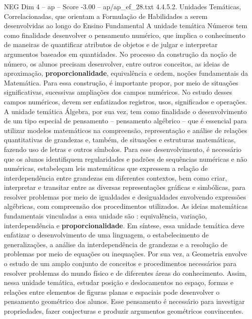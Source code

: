 \begin{textsample}{NEG Dim 4 – ap – Score -3.00 – ap/ap\_ef\_28.txt}  \label{ex:f4_neg_053}
4.4.5.2.
Unidades Temáticas, Correlacionadas, que orientam a Formulação de Habilidades a serem desenvolvidas ao longo do Ensino Fundamental A unidade temática Números tem como finalidade desenvolver o pensamento numérico, que implica o conhecimento de maneiras de quantificar atributos de objetos e de julgar e interpretar argumentos baseados em quantidades.
No processo da construção da noção de número, os alunos precisam desenvolver, entre outros conceitos, as ideias de aproximação, \textbf{proporcionalidade}, equivalência e ordem, noções fundamentais da Matemática.
Para essa construção, é importante propor, por meio de situações significativas, sucessivas ampliações dos campos numéricos.
No estudo desses campos numéricos, devem ser enfatizados registros, usos, significados e operações.
A unidade temática Álgebra, por sua vez, tem como finalidade o desenvolvimento de um tipo especial de pensamento – pensamento algébrico – que é essencial para utilizar modelos matemáticos na compreensão, representação e análise de relações quantitativas de grandezas e, também, de situações e estruturas matemáticas, fazendo uso de letras e outros símbolos.
Para esse desenvolvimento, é necessário que os alunos identifiquem regularidades e padrões de sequências numéricas e não numéricas, estabeleçam leis matemáticas que expressem a relação de interdependência entre grandezas em diferentes contextos, bem como criar, interpretar e transitar entre as diversas representações gráficas e simbólicas, para resolver problemas por meio de igualdades e desigualdades envolvendo expressões algébricas, com compreensão dos procedimentos utilizados.
As ideias matemáticas fundamentais vinculadas a essa unidade são : equivalência, variação, interdependência e \textbf{proporcionalidade}.
Em síntese, essa unidade temática deve enfatizar o desenvolvimento de uma linguagem, o estabelecimento de generalizações, a análise da interdependência de grandezas e a resolução de problemas por meio de equações ou inequações.
Por sua vez, a Geometria envolve o estudo de um amplo conjunto de conceitos e procedimentos necessários para resolver problemas do mundo físico e de diferentes áreas do conhecimento.
Assim, nessa unidade temática, estudar posição e deslocamentos no espaço, formas e relações entre elementos de figuras planas e espaciais pode desenvolver o pensamento geométrico dos alunos.
Esse pensamento é necessário para investigar propriedades, fazer conjecturas e produzir argumentos geométricos convincentes.

\end{textsample}
